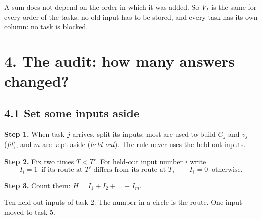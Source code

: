 \documentclass[11pt,a4paper]{article}
\newcommand{\step}[1]{\textbf{Step #1.}}
\begin{document}
A sum does not depend on the order in which it was added. So $V_T$ is the same for every order of
the tasks, no old input has to be stored, and every task has its own column: no task is blocked.

\section*{4. The audit: how many answers changed?}

\subsection*{4.1 Set some inputs aside}

\step{1} When task $j$ arrives, split its inputs: most are used to build $G_j$ and $v_j$ (\emph{fit}),
and $m$ are kept aside (\emph{held-out}). The rule never uses the held-out inputs.

\begin{center}
\end{center}

\step{2} Fix two times $T < T'$. For held-out input number $i$ write
\[ I_i = 1 \ \text{ if its route at } T' \text{ differs from its route at } T, \qquad I_i = 0 \ \text{ otherwise.} \]

\step{3} Count them: \quad $H = I_1 + I_2 + \dots + I_m$.

\begin{center}

{\small Ten held-out inputs of task 2. The number in a circle is the route. One input moved to task 5.}
\end{center}
\end{document}
